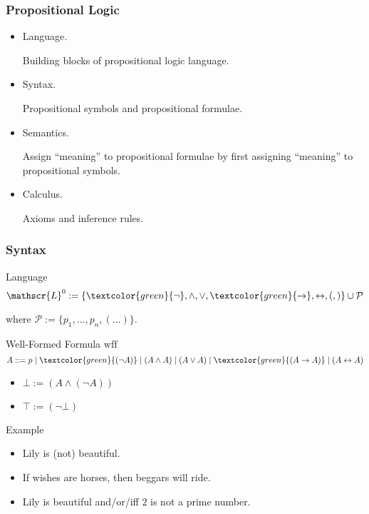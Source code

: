 \documentclass[UTF8,aspectratio=43,11pt,colorlinks,compress,openany]{beamer}%
\begin{document}
\begin{frame}\frametitle{Propositional Logic}
	\begin{itemize}
		\item Language.
		
		Building blocks of propositional logic language.
		\item Syntax.
		
		Propositional symbols and propositional formulae.
		\item Semantics.
		
		Assign ``meaning'' to propositional formulae by first assigning ``meaning'' to propositional symbols.
		\item Calculus.
		
		Axioms and inference rules.
	\end{itemize}
\end{frame}

\begin{frame}\frametitle{Syntax}
		\begin{block}{Language}
			\[\mathscr{L}^0:=\{\textcolor{green}{\neg},\wedge,\vee,\textcolor{green}{\to},\leftrightarrow,(,)\}\cup\mathcal{P}\]
		\end{block}
		where $\mathcal{P}:=\{p_1,\dots,p_n,(\dots)\}$.
		\begin{block}{Well-Formed Formula $\mathrm{wff}$}
			\[A::=p\mid \textcolor{green}{(\neg A)}\mid (A\wedge A)\mid (A\vee A)\mid \textcolor{green}{(A\to A)}\mid (A\leftrightarrow A)\]
		\end{block}
		\begin{itemize}
			\item $\bot:=(A\wedge(\neg A))$
			\item $\top:=(\neg\bot)$
		\end{itemize}
		\begin{block}{Example}
			\begin{itemize}
				\item Lily is (not) beautiful.
				\item If wishes are horses, then beggars will ride.
				\item Lily is beautiful and/or/iff $2$ is not a prime number.
			\end{itemize}
		\end{block}
\end{frame}
\end{document}
